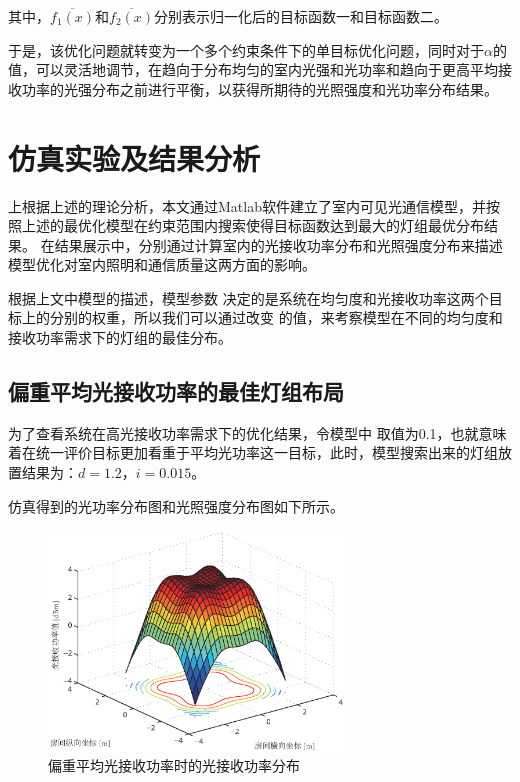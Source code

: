 其中，$\overline {{f_1}(x)}$和$\overline {{f_2}(x)}$分别表示归一化后的目标函数一和目标函数二。

于是，该优化问题就转变为一个多个约束条件下的单目标优化问题，同时对于$\alpha$的值，可以灵活地调节，在趋向于分布均匀的室内光强和光功率和趋向于更高平均接收功率的光强分布之前进行平衡，以获得所期待的光照强度和光功率分布结果。

\section{仿真实验及结果分析}\label{sec:led-layout-simulation-result}
上根据上述的理论分析，本文通过Matlab软件建立了室内可见光通信模型，并按照上述的最优化模型在约束范围内搜索使得目标函数达到最大的灯组最优分布结果。
在结果展示中，分别通过计算室内的光接收功率分布和光照强度分布来描述模型优化对室内照明和通信质量这两方面的影响。

根据上文中模型的描述，模型参数 决定的是系统在均匀度和光接收功率这两个目标上的分别的权重，所以我们可以通过改变 的值，来考察模型在不同的均匀度和接收功率需求下的灯组的最佳分布。

\subsection{偏重平均光接收功率的最佳灯组布局}
为了查看系统在高光接收功率需求下的优化结果，令模型中 取值为0.1，也就意味着在统一评价目标更加看重于平均光功率这一目标，此时，模型搜索出来的灯组放置结果为：$d = 1.2$，$i = 0.015$。

仿真得到的光功率分布图和光照强度分布图如下所示。

\begin{figure}[htbp]
    \centering
	\includegraphics[width=0.7\textwidth]{figures/chapter-3/PowerFirstPower.eps}
	\caption{偏重平均光接收功率时的光接收功率分布}
	\label{fig:power_first_power}
\end{figure}

